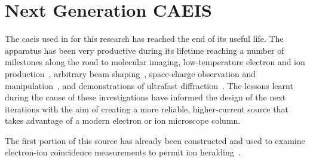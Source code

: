 \section{Next Generation CAEIS}

The \gls{caeis} used in for this research has reached the end of its useful life.
The apparatus has been very productive during its lifetime reaching a number of milestones along the road to molecular imaging, low-temperature electron and ion production~\cite{saliba_spatial_2012,mcculloch_high-coherence_2013,mcculloch_field_2017,speirs_identification_2017}, arbitrary beam shaping~\cite{mcculloch_arbitrarily_2011}, space-charge observation and manipulation~\cite{murphy_detailed_2014,murphy_increasing_2015,thompson_suppression_2016}, and demonstrations of ultrafast diffraction~\cite{speirs_single-shot_2015}.
The lessons learnt during the cause of these investigations have informed the design of the next iterations with the aim of creating a more reliable, higher-current source that takes advantage of a modern electron or ion microscope column.

The first portion of this source has already been constructed and used to examine electron-ion coincidence measurements to permit ion heralding~\cite{mcculloch_heralded_2018}.